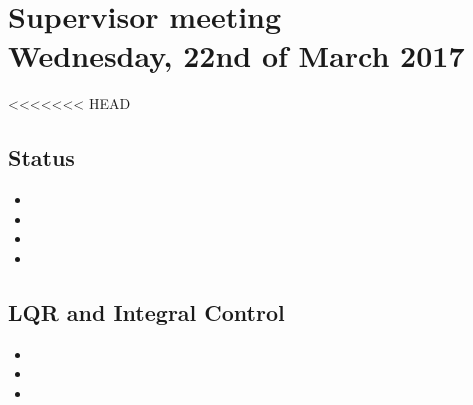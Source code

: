 
\renewcommand{\vec}[1]{\boldsymbol{\mathbf{#1}}}


\section*{Supervisor meeting\\ \small Wednesday, 22nd of March 2017}
<<<<<<< HEAD
\subsection{Status}
\begin{itemize}
	\item 
	\item
	\item
	\item
\end{itemize}	
\subsection{LQR and Integral Control}
\begin{itemize}
	\item 
	\item 
	\item 
\end{itemize}	
